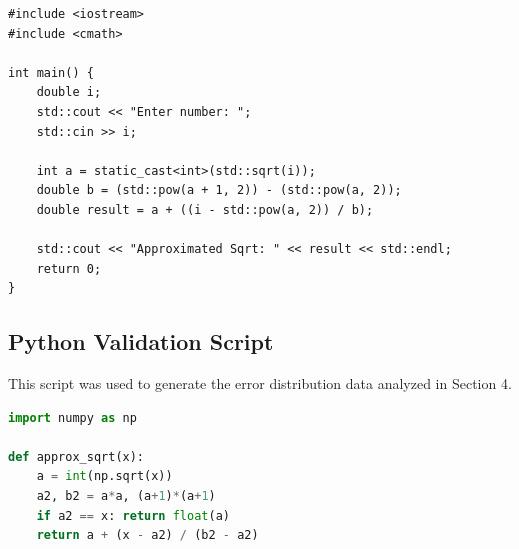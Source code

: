 \documentclass{article}
\begin{document}
\begin{lstlisting}
#include <iostream>
#include <cmath>

int main() {
    double i;
    std::cout << "Enter number: ";
    std::cin >> i;

    int a = static_cast<int>(std::sqrt(i));
    double b = (std::pow(a + 1, 2)) - (std::pow(a, 2));
    double result = a + ((i - std::pow(a, 2)) / b);

    std::cout << "Approximated Sqrt: " << result << std::endl;
    return 0;
}
\end{lstlisting}

\subsection{Python Validation Script}
This script was used to generate the error distribution data analyzed in Section 4.
\begin{lstlisting}[language=Python]
import numpy as np

def approx_sqrt(x):
    a = int(np.sqrt(x))
    a2, b2 = a*a, (a+1)*(a+1)
    if a2 == x: return float(a)
    return a + (x - a2) / (b2 - a2)
\end{lstlisting}
\end{document}
